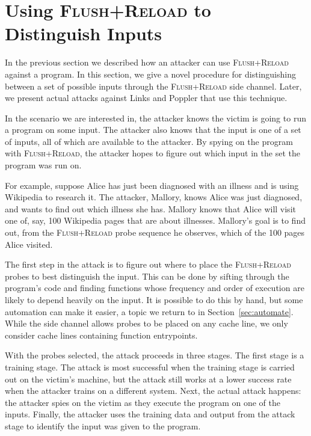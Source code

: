 \documentclass[letterpaper,twocolumn,10pt]{article}
\begin{document}
\section{Using \textsc{Flush+Reload} to Distinguish Inputs}
\label{sec:distinguishing}

In the previous section we described how an attacker can use
\textsc{Flush+Reload} against a program.
In this
section, we give a novel procedure for distinguishing between a set of possible
inputs through the \textsc{Flush+Reload} side channel. Later, we present actual
attacks against Links and Poppler that use this technique.

In the scenario we are interested in, the attacker knows the victim is going to
run a program on some input. The attacker also knows that the input is one of a set
of inputs, all of which are available to the attacker. By spying on the program
with \textsc{Flush+Reload}, the attacker hopes to figure out which input in the
set the program was run on.

For example, suppose Alice has just been diagnosed with an illness and is using
Wikipedia to research it. The attacker, Mallory, knows Alice was just diagnosed,
and wants to find out which illness she has. Mallory knows that Alice will visit
one of, say, 100 Wikipedia pages that are about illnesses. Mallory's goal is to
find out, from the \textsc{Flush+Reload} probe sequence he observes, which of
the 100 pages Alice visited.

The first step in the attack is to figure out where to place the
\textsc{Flush+Reload} probes to best distinguish the input. This can be done by
sifting through the program's code and finding functions whose frequency and
order of execution are likely to depend heavily on the input. It is possible to
do this by hand, but some automation can make it easier, a topic we return to in
Section~\ref{sec:automate}. While the side channel allows probes to be placed on
any cache line, we only consider cache lines containing function entrypoints.

With the probes selected, the attack proceeds in three stages. The first stage
is a training stage. The attack is most successful when the training stage is
carried out on the victim's machine, but the attack still works at a lower
success rate when the attacker trains on a different system. Next, the actual
attack happens: the attacker spies on the victim as they execute the program on
one of the inputs. Finally, the attacker uses the training data and output from
the attack stage to identify the input was given to the program.
\end{document}
